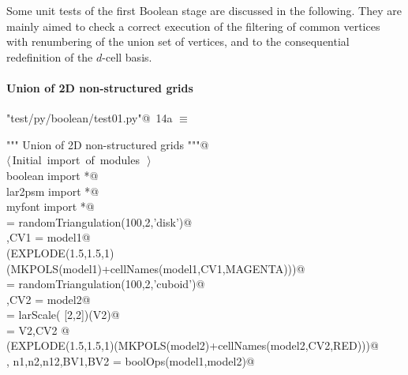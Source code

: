\documentclass[11pt,oneside]{article}	%
\begin{document}
Some unit tests of the first Boolean stage are discussed in the following. They are mainly aimed to check a correct execution of the filtering of common vertices with renumbering of the union set of vertices, and to the consequential redefinition of the $d$-cell basis.

\paragraph{Union of 2D non-structured grids}

\begin{flushleft} \small
\begin{minipage}{\linewidth} \label{scrap22}
\protect{}\verb@"test/py/boolean/test01.py"@\nobreak\ {\footnotesize 14a }$\equiv$
\vspace{-1ex}
\begin{list}{}{} \item
\mbox{}\verb@""" Union of 2D non-structured grids """@\\
\mbox{}\verb@@\hbox{$\langle\,$Initial import of modules\nobreak\ {\footnotesize {}}$\,\rangle$}\verb@@\\
\mbox{}\verb@from boolean import *@\\
\mbox{}\verb@from lar2psm import *@\\
\mbox{}\verb@from myfont import *@\\
\mbox{} = randomTriangulation(100,2,'disk')@\\
\mbox{},CV1 = model1@\\
\mbox{}\verb@VIEW(EXPLODE(1.5,1.5,1)(MKPOLS(model1)+cellNames(model1,CV1,MAGENTA)))@\\
\mbox{} = randomTriangulation(100,2,'cuboid')@\\
\mbox{},CV2 = model2@\\
\mbox{} = larScale( [2,2])(V2)@\\
\mbox{} = V2,CV2 @\\
\mbox{}\verb@VIEW(EXPLODE(1.5,1.5,1)(MKPOLS(model2)+cellNames(model2,CV2,RED)))@\\
\mbox{}\verb@V, n1,n2,n12,BV1,BV2 = boolOps(model1,model2)@\\
\mbox{}\verb@@{\NWsep}
\end{list}
\vspace{-2ex}
\end{minipage}\\[4ex]
\end{flushleft}
\end{document}
